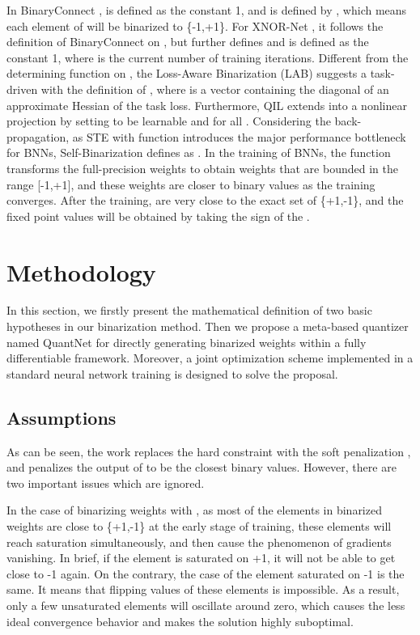 \documentclass[runningheads]{llncs}
\begin{document}
In BinaryConnect \cite{courbariaux2015binaryconnect},
 is defined as the constant 1,
and  is defined by ,
which means each element of  will be binarized to \{-1,+1\}.
For XNOR-Net \cite{rastegari2016xnor},
it follows the definition of BinaryConnect on ,
but further defines 
and  is defined as the constant 1,
where  is the current number of training iterations.
Different from the determining function on ,
the Loss-Aware Binarization (LAB) \cite{hou2016loss} suggests
a task-driven  with the definition of
,
where  is a vector containing the diagonal  of
an approximate Hessian  of the task loss.
Furthermore, QIL \cite{jung2019learning} extends 
into a nonlinear projection by setting  to be learnable and  for all .
Considering the back-propagation,
as STE \cite{yin2019understanding} with  function
introduces the major performance bottleneck for BNNs,
Self-Binarization \cite{lahoud2019self} defines  as .
In the training of BNNs,
the  function transforms the full-precision weights 
to obtain weights  that are bounded in the range [-1,+1],
and these weights are closer to binary values as the training converges.
After the training,  are very close to the exact set of \{+1,-1\},
and the fixed point values will be obtained by taking the sign of the .

\section{Methodology}
In this section,
we firstly present the mathematical definition of two basic hypotheses in our binarization method.
Then we propose a meta-based quantizer named QuantNet for directly generating
binarized weights within a fully differentiable framework.
Moreover, a joint optimization scheme implemented in a standard neural network training is designed to solve the proposal.

\subsection{Assumptions}
As can be seen,
the work \cite{lahoud2019self} replaces the hard constraint  with the soft penalization ,
and penalizes the output of  to be the closest binary values.
However, there are two important issues which are ignored.

In the case of binarizing weights with ,
as most of the elements in binarized weights are close to \{+1,-1\} at the early stage of training,
these elements will reach saturation simultaneously, and then cause the phenomenon of gradients vanishing.
In brief, if the element is saturated on +1, it will not be able to get close to -1 again.
On the contrary, the case of the element saturated on -1 is the same.
It means that flipping values of these elements is impossible.
As a result, only a few unsaturated elements will oscillate around zero,
which causes the less ideal convergence behavior and makes the solution highly suboptimal.
\end{document}
